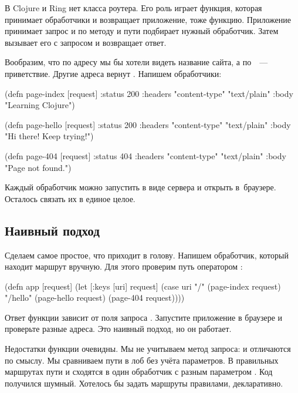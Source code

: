 В Clojure и Ring нет класса роутера. Его роль играет функция, которая принимает
обработчики и возвращает приложение, тоже функцию. Приложение принимает запрос и
по методу и пути подбирает нужный обработчик. Затем вызывает его с запросом и
возвращает ответ.


Вообразим, что по адресу \code{/} мы бы хотели видеть название сайта, а
по~~--- приветствие. Другие адреса вернут
. Напишем обработчики:

\begin{clojure}
(defn page-index [request]
  {:status 200
   :headers {"content-type" "text/plain"}
   :body "Learning Clojure"})

(defn page-hello [request]
  {:status 200
   :headers {"content-type" "text/plain"}
   :body "Hi there! Keep trying!"})

(defn page-404 [request]
  {:status 404
   :headers {"content-type" "text/plain"}
   :body "Page not found."})
\end{clojure}

Каждый обработчик можно запустить в виде сервера и открыть в~браузере. Осталось
связать их в единое целое.

\subsection{Наивный подход}

Сделаем самое простое, что приходит в голову. Напишем обработчик, который
находит маршрут вручную. Для этого проверим путь оператором :

\begin{clojure}
(defn app [request]
  (let [{:keys [uri]} request]
    (case uri
      "/"      (page-index request)
      "/hello" (page-hello request)
      (page-404 request))))
\end{clojure}

Ответ функции зависит от поля запроса . Запустите приложение в
браузере и проверьте разные адреса. Это наивный подход, но он работает.

Недостатки функции очевидны. Мы не учитываем метод запроса:
 и  отличаются по смыслу. Мы сравниваем пути
в лоб без учёта параметров. В правильных маршрутах пути  и
 сходятся в один обработчик с разным параметром . Код
получился шумный. Хотелось бы задать маршруты правилами, декларативно.

